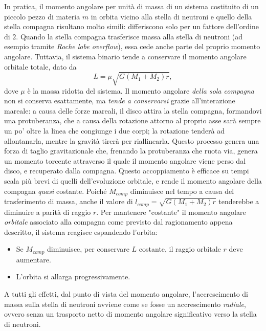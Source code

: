 In pratica, il momento angolare per unità di massa di un sistema costituito di un piccolo pezzo di materia $m$ in orbita vicino alla stella di neutroni e quello della stella compagna risultano molto simili: differiscono solo per un fattore dell'ordine di $2$.
Quando la stella compagna trasferisce massa alla stella di neutroni (ad esempio tramite \emph{Roche lobe overflow}), essa cede anche parte del proprio momento angolare. Tuttavia, il sistema binario tende a conservare il momento angolare orbitale totale, dato da
\begin{equation}
    L = \mu \sqrt{G(M_1+M_2)r},
\end{equation}
dove $\mu$ è la massa ridotta del sistema.
Il momento angolare \emph{della sola compagna} non si conserva esattamente, ma \textit{tende a conservarsi} grazie all'interazione mareale: a causa delle forze mareali, il disco attira la stella compagna, formandovi una protuberanza, che a causa della rotazione attorno al proprio asse sarà sempre un po' oltre la linea che congiunge i due corpi; la rotazione tenderà ad allontanarla, mentre la gravità tirerà per riallinearla.
Questo processo genera una forza di taglio gravitazionale che, frenando la protuberanza che ruota via, genera un momento torcente attraverso il quale il momento angolare viene perso dal disco, e recuperato dalla compagna. 
Questo accoppiamento è efficace su tempi scala più brevi di quelli dell'evoluzione orbitale, e rende il momento angolare della compagna \emph{quasi} costante.
Poiché $M_{comp}$ diminuisce nel tempo a causa del trasferimento di massa, anche il valore di $l_{comp} = \sqrt{G(M_1+M_2)r}$ tenderebbe a diminuire a parità di raggio $r$. 
Per mantenere "costante" il momento angolare \textit{orbitale} associato alla compagna come previsto dal ragionamento appena descritto, il sistema reagisce espandendo l'orbita:
\begin{itemize}
    \item Se $M_{comp}$ diminuisce, per conservare $L$ costante, il raggio orbitale $r$ deve aumentare.
    \item L'orbita si allarga progressivamente.
\end{itemize}
A tutti gli effetti, dal punto di vista del momento angolare, l'accrescimento di massa sulla stella di neutroni avviene come se fosse un accrescimento \emph{radiale}, ovvero senza un trasporto netto di momento angolare significativo verso la stella di neutroni.
